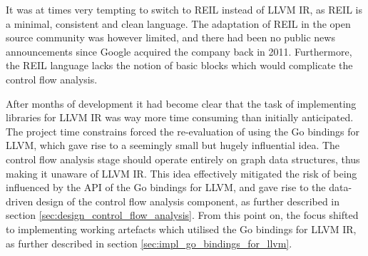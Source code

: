 It was at times very tempting to switch to REIL instead of LLVM IR, as REIL is a minimal, consistent and clean language. The adaptation of REIL in the open source community was however limited, and there had been no public news announcements since Google acquired the company back in 2011. Furthermore, the REIL language lacks the notion of basic blocks which would complicate the control flow analysis.

After months of development it had become clear that the task of implementing libraries for LLVM IR was way more time consuming than initially anticipated. The project time constrains forced the re-evaluation of using the Go bindings for LLVM, which gave rise to a seemingly small but hugely influential idea. The control flow analysis stage should operate entirely on graph data structures, thus making it unaware of LLVM IR. This idea effectively mitigated the risk of being influenced by the API of the Go bindings for LLVM, and gave rise to the data-driven design of the control flow analysis component, as further described in section \ref{sec:design_control_flow_analysis}. From this point on, the focus shifted to implementing working artefacts which utilised the Go bindings for LLVM IR, as further described in section \ref{sec:impl_go_bindings_for_llvm}.
